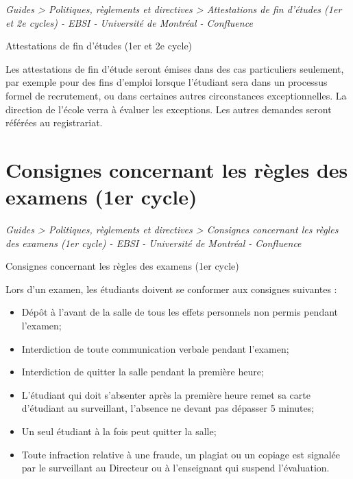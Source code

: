 \documentclass [12 pt]{article}
\begin{document}
        \textit{
        Guides > Politiques, règlements et directives > Attestations de fin
            d'études (1er et 2e cycles) - EBSI - Université de Montréal - Confluence
        }
    
        Attestations de fin d'études (1er et 2e cycle)
        
            Les attestations de fin d'étude seront émises dans des cas particuliers seulement,
                par exemple pour des fins d'emploi lorsque l'étudiant sera dans un processus formel
                de recrutement, ou dans certaines autres circonstances exceptionnelles. La direction
                de l'école verra à évaluer les exceptions. Les autres demandes seront référées au
                registrariat.
        
    
    
        \newpage
        \section {
        Consignes concernant les règles des examens (1er cycle)
        }
        
        
        
        \textit{
        Guides > Politiques, règlements et directives > Consignes concernant les règles
            des examens (1er cycle) - EBSI - Université de Montréal - Confluence
        }
    
        Consignes concernant les règles des examens (1er cycle)
        
            Lors d'un examen, les étudiants doivent se conformer aux consignes suivantes :
            
        \begin{itemize}
        
                
        \item Dépôt à l'avant de la salle de tous les effets personnels non permis pendant
                    l'examen;
                
        \item Interdiction de toute communication verbale pendant l'examen;
                
        \item Interdiction de quitter la salle pendant la première heure;
                
        \item L'étudiant qui doit s'absenter après la première heure remet sa carte d'étudiant
                    au surveillant, l'absence ne devant pas dépasser 5 minutes;
                
        \item Un seul étudiant à la fois peut quitter la salle;
                
        \item Toute infraction relative à une fraude, un plagiat ou un copiage est signalée
                    par le surveillant au Directeur ou à l'enseignant qui suspend l'évaluation.
            
        \end{itemize}
    
\end{document}

